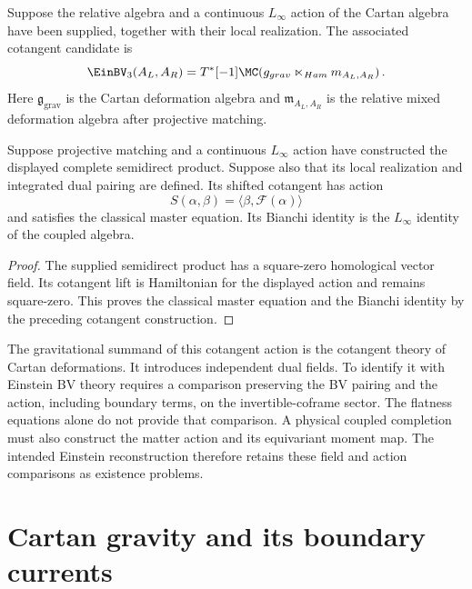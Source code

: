 \begin{definition}
Suppose the relative algebra and a continuous $L_\infty$ action of the Cartan algebra have been supplied, together with their local realization. The associated cotangent candidate is
\[
 \EinBV_3(A_L,A_R)
 =T^*[-1]\MC\!\left(
   \mathfrak g_{\mathrm{grav}}
   \ltimes_{\mathrm{Ham}}
   \mathfrak m_{A_L,A_R}
  \right).
\]
Here $\mathfrak g_{\mathrm{grav}}$ is the Cartan deformation algebra and $\mathfrak m_{A_L,A_R}$ is the relative mixed deformation algebra after projective matching.
\end{definition}

\begin{theorem}
Suppose projective matching and a continuous $L_\infty$ action have constructed the displayed complete semidirect product. Suppose also that its local realization and integrated dual pairing are defined. Its shifted cotangent has action
\[
 S(\alpha,\beta)=\langle\beta,\mathcal F(\alpha)\rangle
\]
and satisfies the classical master equation. Its Bianchi identity is the $L_\infty$ identity of the coupled algebra.
\end{theorem}
\begin{proof}
The supplied semidirect product has a square-zero homological vector field. Its cotangent lift is Hamiltonian for the displayed action and remains square-zero. This proves the classical master equation and the Bianchi identity by the preceding cotangent construction.
\end{proof}

The gravitational summand of this cotangent action is the cotangent theory of Cartan deformations. It introduces independent dual fields. To identify it with Einstein BV theory requires a comparison preserving the BV pairing and the action, including boundary terms, on the invertible-coframe sector. The flatness equations alone do not provide that comparison. A physical coupled completion must also construct the matter action and its equivariant moment map. The intended Einstein reconstruction therefore retains these field and action comparisons as existence problems.

\chapter{Cartan gravity and its boundary currents}


